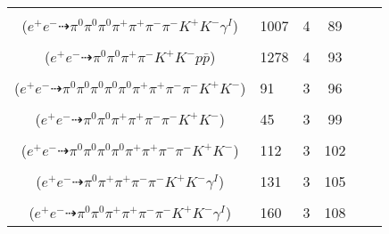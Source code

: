 \documentclass[landscape]{article}
\newcounter{rownumbers}
\newcommand\rn{\stepcounter{rownumbers}\arabic{rownumbers}}
\newcommand{\EOL}{\\} %
\newcommand{\topoTags}[1]{#1} %
\begin{document}
\begin{longtable}{clcccc}
\rn & \makecell[l]{ $ 
e^{+} e^{-} \rightarrow \pi^{0} \pi^{+} \pi^{+} \rho^{-} \rho^{-} K^{+} K^{-} \gamma^{I} ,
\rho^{-} \rightarrow \pi^{0} \pi^{-} ,
\rho^{-} \rightarrow \pi^{0} \pi^{-} 
$ \\ ($
e^{+} e^{-} \dashrightarrow \pi^{0} \pi^{0} \pi^{0} \pi^{+} \pi^{+} \pi^{-} \pi^{-} K^{+} K^{-} \gamma^{I} 
$) } & \topoTags{1007 & }4 & 89 \EOL

\rn & \makecell[l]{ $ 
e^{+} e^{-} \rightarrow \pi^{0} \pi^{0} \pi^{+} \pi^{-} K^{+} K^{-} p \bar{p} 
$ \\ ($
e^{+} e^{-} \dashrightarrow \pi^{0} \pi^{0} \pi^{+} \pi^{-} K^{+} K^{-} p \bar{p} 
$) } & \topoTags{1278 & }4 & 93 \EOL

\rn & \makecell[l]{ $ 
e^{+} e^{-} \rightarrow \pi^{0} \pi^{0} \pi^{0} \pi^{-} \pi^{-} \rho^{+} \rho^{+} K^{+} K^{-} ,
\rho^{+} \rightarrow \pi^{0} \pi^{+} ,
\rho^{+} \rightarrow \pi^{0} \pi^{+} 
$ \\ ($
e^{+} e^{-} \dashrightarrow \pi^{0} \pi^{0} \pi^{0} \pi^{0} \pi^{0} \pi^{+} \pi^{+} \pi^{-} \pi^{-} K^{+} K^{-} 
$) } & \topoTags{91 & }3 & 96 \EOL

\rn & \makecell[l]{ $ 
e^{+} e^{-} \rightarrow \pi^{0} \rho^{0} \pi^{+} \rho^{-} K^{+} K^{-} ,
\rho^{0} \rightarrow \pi^{+} \pi^{-} ,
\rho^{-} \rightarrow \pi^{0} \pi^{-} 
$ \\ ($
e^{+} e^{-} \dashrightarrow \pi^{0} \pi^{0} \pi^{+} \pi^{+} \pi^{-} \pi^{-} K^{+} K^{-} 
$) } & \topoTags{45 & }3 & 99 \EOL

\rn & \makecell[l]{ $ 
e^{+} e^{-} \rightarrow \pi^{0} \pi^{0} \pi^{+} \pi^{-} \pi^{-} \rho^{+} K^{+} K^{*-} ,
\rho^{+} \rightarrow \pi^{0} \pi^{+} ,
K^{*-} \rightarrow \pi^{0} K^{-} 
$ \\ ($
e^{+} e^{-} \dashrightarrow \pi^{0} \pi^{0} \pi^{0} \pi^{0} \pi^{+} \pi^{+} \pi^{-} \pi^{-} K^{+} K^{-} 
$) } & \topoTags{112 & }3 & 102 \EOL

\rn & \makecell[l]{ $ 
e^{+} e^{-} \rightarrow \pi^{0} \rho^{0} \pi^{+} \pi^{-} K^{+} K^{-} \gamma^{I} ,
\rho^{0} \rightarrow \pi^{+} \pi^{-} 
$ \\ ($
e^{+} e^{-} \dashrightarrow \pi^{0} \pi^{+} \pi^{+} \pi^{-} \pi^{-} K^{+} K^{-} \gamma^{I} 
$) } & \topoTags{131 & }3 & 105 \EOL

\rn & \makecell[l]{ $ 
e^{+} e^{-} \rightarrow \pi^{+} \pi^{-} \rho^{+} \rho^{-} K^{+} K^{-} \gamma^{I} ,
\rho^{+} \rightarrow \pi^{0} \pi^{+} ,
\rho^{-} \rightarrow \pi^{0} \pi^{-} 
$ \\ ($
e^{+} e^{-} \dashrightarrow \pi^{0} \pi^{0} \pi^{+} \pi^{+} \pi^{-} \pi^{-} K^{+} K^{-} \gamma^{I} 
$) } & \topoTags{160 & }3 & 108 \EOL


\end{longtable}
\end{document}
